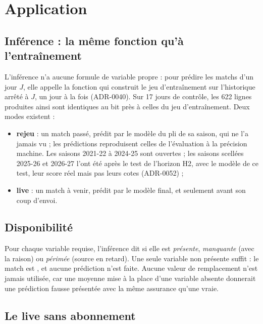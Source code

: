 
\chapter{Application}
\label{chap:application}

\section{Inférence : la même fonction qu'à l'entraînement}

L'inférence n'a aucune formule de variable propre : pour prédire les matchs d'un jour \(J\), elle appelle
la fonction qui construit le jeu d'entraînement sur l'historique arrêté à \(J\), un jour à la fois
(ADR-0040). Sur 17 jours de contrôle, les 622 lignes produites ainsi sont identiques au bit près à celles
du jeu d'entraînement. Deux modes existent :

\begin{itemize}
  \item \textbf{rejeu} : un match passé, prédit par le modèle du pli de sa saison, qui ne l'a jamais vu ;
        les prédictions reproduisent celles de l'évaluation à la précision machine. Les saisons 2021-22 à
        2024-25 sont ouvertes ; les saisons scellées 2025-26 et 2026-27 l'ont été après le test de
        l'horizon H2, avec le modèle de ce test, leur score réel mais pas leurs cotes (ADR-0052) ;
  \item \textbf{live} : un match à venir, prédit par le modèle final, et seulement avant son coup
        d'envoi.
\end{itemize}

\section{Disponibilité}

Pour chaque variable requise, l'inférence dit si elle est \emph{présente}, \emph{manquante} (avec la
raison) ou \emph{périmée} (source en retard). Une seule variable non présente suffit : le match est
, et aucune prédiction n'est faite. Aucune valeur de remplacement n'est jamais
utilisée, car une moyenne mise à la place d'une variable absente donnerait une prédiction fausse
présentée avec la même assurance qu'une vraie.

\section{Le live sans abonnement}

